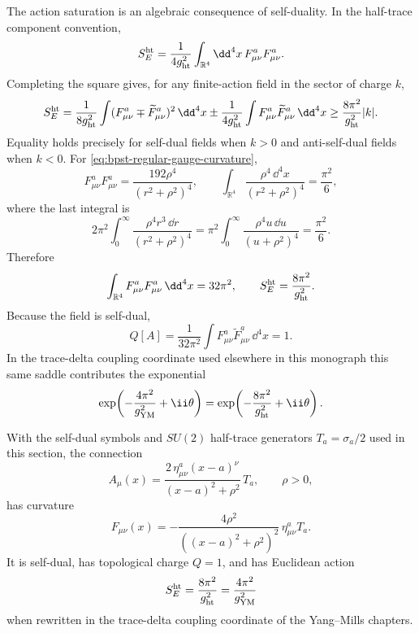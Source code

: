 The action saturation is an algebraic consequence of self-duality.  In the
half-trace component convention,
\[
  S_E^{\rm ht}
  =
  \frac1{4g_{\rm ht}^2}
  \int_{\mathbb R^4}\dd^4x\,
  F^a_{\mu\nu}F^a_{\mu\nu}.
\]
Completing the square gives, for any finite-action field in the sector of
charge \(k\),
\begin{equation}
  S_E^{\rm ht}
  =
  \frac1{8g_{\rm ht}^2}
  \int (F^a_{\mu\nu}\mp\widetilde F^a_{\mu\nu})^2\,\dd^4x
  \pm
  \frac1{4g_{\rm ht}^2}
  \int F^a_{\mu\nu}\widetilde F^a_{\mu\nu}\,\dd^4x
  \ge
  \frac{8\pi^2}{g_{\rm ht}^2}|k|.
  \label{eq:instanton-action-bound-half-trace}
\end{equation}
Equality holds precisely for self-dual fields when \(k>0\) and anti-self-dual
fields when \(k<0\).  For \eqref{eq:bpst-regular-gauge-curvature},
\[
  F^a_{\mu\nu}F^a_{\mu\nu}
  =
  \frac{192\rho^4}{(r^2+\rho^2)^4},
  \qquad
  \int_{\mathbb R^4}
  \frac{\rho^4\,\dd^4x}{(r^2+\rho^2)^4}
  =
  \frac{\pi^2}{6},
\]
where the last integral is
\[
  2\pi^2\int_0^\infty
  \frac{\rho^4r^3\,\dd r}{(r^2+\rho^2)^4}
  =
  \pi^2\int_0^\infty
  \frac{\rho^4u\,\dd u}{(u+\rho^2)^4}
  =
  \frac{\pi^2}{6}.
\]
Therefore
\[
  \int_{\mathbb R^4}F^a_{\mu\nu}F^a_{\mu\nu}\,\dd^4x=32\pi^2,
  \qquad
  S_E^{\rm ht}=\frac{8\pi^2}{g_{\rm ht}^2}.
\]
Because the field is self-dual,
\[
  Q[A]
  =
  \frac1{32\pi^2}
  \int F^a_{\mu\nu}\widetilde F^a_{\mu\nu}\,\dd^4x
  =
  1 .
\]
In the trace-delta coupling coordinate used elsewhere in this monograph this
same saddle contributes the exponential
\begin{equation}
  \exp\!\left(-\frac{4\pi^2}{g_{\rm YM}^2}+\ii\theta\right)
  =
  \exp\!\left(-\frac{8\pi^2}{g_{\rm ht}^2}+\ii\theta\right).
  \label{eq:bpst-instanton-exponential-conventions}
\end{equation}

\begin{lemma}
\label{lem:bpst-one-instanton-data}
With the self-dual symbols and \(SU(2)\) half-trace generators
\(T_a=\sigma_a/2\) used in this section, the connection
\[
  A_\mu(x)
  =
  \frac{2\,\eta^a_{\mu\nu}(x-a)^\nu}{(x-a)^2+\rho^2}\,T_a,
  \qquad
  \rho>0,
\]
has curvature
\[
  F_{\mu\nu}(x)
  =
  -\frac{4\rho^2}{((x-a)^2+\rho^2)^2}\,
  \eta^a_{\mu\nu}T_a .
\]
It is self-dual, has topological charge \(Q=1\), and has Euclidean action
\[
  S_E^{\rm ht}=\frac{8\pi^2}{g_{\rm ht}^2}
  =
  \frac{4\pi^2}{g_{\rm YM}^2}
\]
when rewritten in the trace-delta coupling coordinate of the Yang--Mills
chapters.
\end{lemma}

